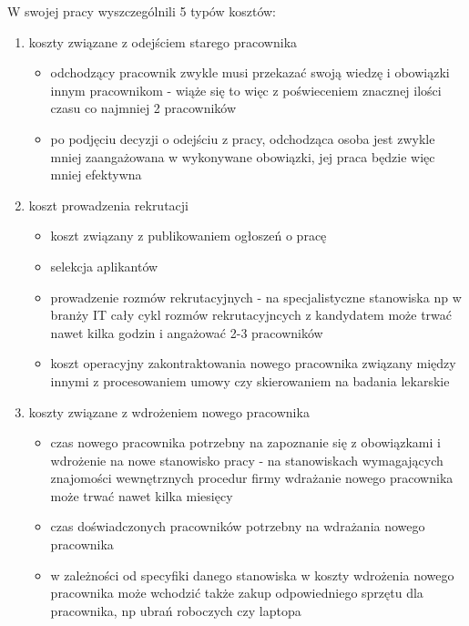W swojej pracy wyszczególnili 5 typów kosztów:
\begin{enumerate}
    \item koszty związane z odejściem starego pracownika
    \begin{itemize}
        \item odchodzący pracownik zwykle musi przekazać swoją wiedzę i obowiązki innym pracownikom -
        wiąże się to więc z poświeceniem znacznej ilości czasu co najmniej 2 pracowników
        \item po podjęciu decyzji o odejściu z pracy, odchodząca osoba jest zwykle mniej zaangażowana w wykonywane obowiązki, jej praca będzie więc mniej efektywna
    \end{itemize}
    \item koszt prowadzenia rekrutacji
    \begin{itemize}
        \item koszt związany z publikowaniem ogłoszeń o pracę
        \item selekcja aplikantów
        \item prowadzenie rozmów rekrutacyjnych - na specjalistyczne stanowiska np w branży IT cały cykl rozmów rekrutacyjncych z kandydatem może trwać nawet kilka godzin i angażować 2-3 pracowników
        \item koszt operacyjny zakontraktowania nowego pracownika związany między innymi z procesowaniem umowy czy skierowaniem na badania lekarskie
    \end{itemize}
    \item koszty związane z wdrożeniem nowego pracownika
    \begin{itemize}
        \item czas nowego pracownika potrzebny na zapoznanie się z obowiązkami i wdrożenie na nowe stanowisko pracy - na stanowiskach wymagających znajomości wewnętrznych procedur firmy wdrażanie nowego pracownika może trwać nawet kilka miesięcy
        \item czas doświadczonych pracowników potrzebny na wdrażania nowego pracownika
        \item w zależności od specyfiki danego stanowiska w koszty wdrożenia nowego pracownika może wchodzić także zakup odpowiedniego sprzętu dla pracownika, np ubrań roboczych czy laptopa
    \end{itemize}


\end{enumerate}
